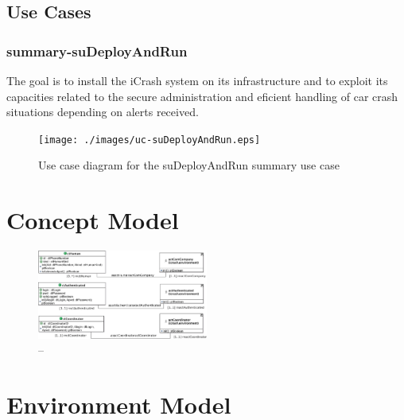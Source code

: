 \subsection{Use Cases}

\subsubsection{summary-suDeployAndRun}

The goal is to install the iCrash system on its infrastructure and to exploit its capacities related to the
secure administration and eficient handling of car crash situations depending on
alerts received.


\begin{figure}[h]
	\centering	
	\captionsetup{justification=centering}
	\texttt{[image: ./images/uc-suDeployAndRun.eps]}
	\caption{Use case diagram for the suDeployAndRun summary use case}
\end{figure}


\section{Concept Model}
 

\begin{figure}[h]
	\centering
	\captionsetup{justification=centering}
	\includegraphics[width=0.5\textwidth]{./images/analysis/concept-model/global/PrimaryTypes-Classes/01/cm-pt-ct-gv-01.eps}
	\caption{--}
\end{figure} 


   

\section{Environment Model}


